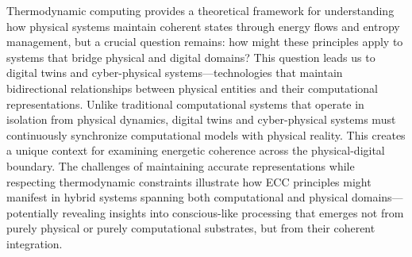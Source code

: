 Thermodynamic computing provides a theoretical framework for understanding how physical systems maintain coherent states through energy flows and entropy management, but a crucial question remains: how might these principles apply to systems that bridge physical and digital domains? This question leads us to digital twins and cyber-physical systems—technologies that maintain bidirectional relationships between physical entities and their computational representations. Unlike traditional computational systems that operate in isolation from physical dynamics, digital twins and cyber-physical systems must continuously synchronize computational models with physical reality. This creates a unique context for examining energetic coherence across the physical-digital boundary. The challenges of maintaining accurate representations while respecting thermodynamic constraints illustrate how ECC principles might manifest in hybrid systems spanning both computational and physical domains—potentially revealing insights into conscious-like processing that emerges not from purely physical or purely computational substrates, but from their coherent integration.
